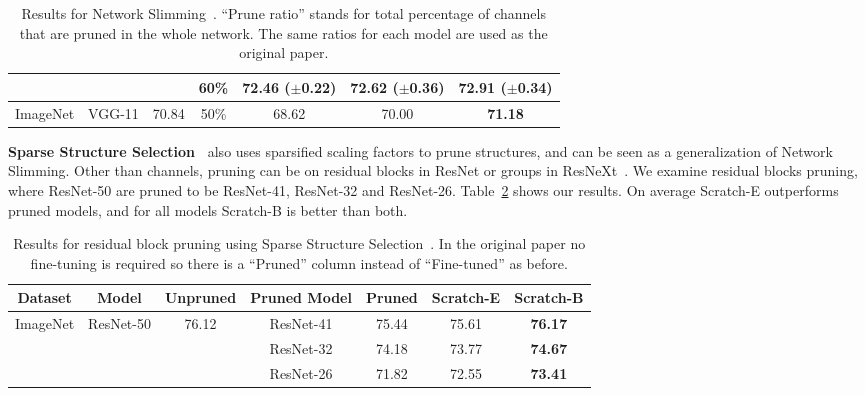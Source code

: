\begin{table}[!htbp]
{\begin{tabular}{c|c|ccccc}
\multicolumn{1}{l|}{} &   &   & \multicolumn{1}{c}{60\%} & \multicolumn{1}{c}{72.46 ($\pm$0.22)} & \multicolumn{1}{c}{72.62 ($\pm$0.36)} &  \textbf{72.91} ($\pm$0.34)        \\ \hline
ImageNet     & VGG-11   & \multicolumn{1}{c}{70.84}   & \multicolumn{1}{c}{50\%}   & \multicolumn{1}{c}{68.62}   & \multicolumn{1}{c}{70.00}  & \textbf{71.18} \\ \hline
\end{tabular}
}
\caption{Results for Network Slimming~\cite{liu2017learning}. ``Prune ratio'' stands for total percentage of channels that are pruned in the whole network. The same ratios for each model are used as the original paper. 
}
\label{network-slimming}
\end{table}

\textbf{Sparse Structure Selection~\cite{huang2018data}} also uses sparsified scaling factors to prune structures, and can be seen as a generalization of Network Slimming. Other than channels, pruning can be on residual blocks in ResNet or groups in ResNeXt~\cite{Xie2017}. We examine residual blocks pruning, where ResNet-50 are pruned to be ResNet-41, ResNet-32 and ResNet-26. Table~\ref{sparse} shows our results. On average Scratch-E outperforms pruned models, and for all models Scratch-B is better than both.


\renewcommand{\arraystretch}{1.2}
\begin{table}[!htbp]
\small
\centering
\begin{tabular}{l|c|ccccc}
\hline
\multicolumn{1}{c|}{Dataset} & Model                      & Unpruned               & Pruned Model & Pruned                          & Scratch-E  & Scratch-B                      \\ \hline
\multirow{3}{*}{ImageNet}    & \multirow{3}{*}{ResNet-50} & \multirow{3}{*}{76.12} & ResNet-41    & 75.44                           & 75.61     & \textbf{76.17} \\
                             &                            &                        & ResNet-32    & 74.18 & 73.77    & \textbf{74.67}       \\
                             &                            &                        & ResNet-26    & 71.82                           & 72.55 & \textbf{73.41}    \\ \hline
\end{tabular}
\caption{Results for residual block pruning using Sparse Structure Selection~\cite{huang2018data}. In the original paper no fine-tuning is required so there is a ``Pruned'' column instead of ``Fine-tuned'' as before. 
}
\label{sparse}
\end{table}

